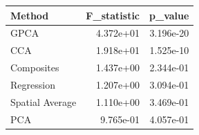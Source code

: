 \begin{tabular}{lrr}
\toprule
Method & F_statistic & p_value \\
\midrule
GPCA & 4.372e+01 & 3.196e-20 \\
CCA & 1.918e+01 & 1.525e-10 \\
Composites & 1.437e+00 & 2.344e-01 \\
Regression & 1.207e+00 & 3.094e-01 \\
Spatial Average & 1.110e+00 & 3.469e-01 \\
PCA & 9.765e-01 & 4.057e-01 \\
\bottomrule
\end{tabular}
